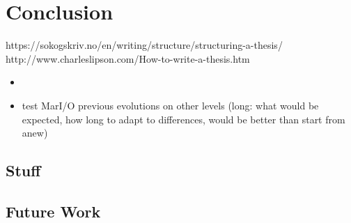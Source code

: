 %
\chapter{Conclusion}
\label{sec:conclusion}



https://sokogskriv.no/en/writing/structure/structuring-a-thesis/
http://www.charleslipson.com/How-to-write-a-thesis.htm

\begin{itemize}
	\item 
	\item test MarI/O previous evolutions on other levels (long: what would be expected, how long to adapt to differences, would be better than start from anew)
\end{itemize}


\section{Stuff}
\label{sec:conclusion:sec1}


\section{Future Work}
\label{sec:conclusion:future}

